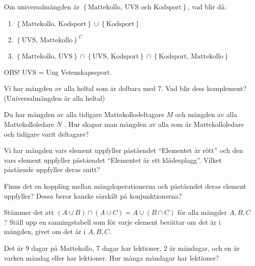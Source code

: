 \begin{problem}
	Om universalmängden är \(\left\{\text{Mattekollo, UVS och Kodsport} \right\}\), vad blir då:
	\begin{enumerate}[label=\alph*)]
		\item \(\left\{\text{Mattekollo, Kodsport} \right\} \cup \left\{\text{Kodsport} \right\}\) 
		\item \(\left\{\text{UVS, Mattekollo}\right\}^C\) 
		\item \(\left\{\text{Mattekollo, UVS}\right\} \cap \left\{\text{UVS, Kodsport} \right\} \cap \left\{\text{Kodsport, Mattekollo} \right\}\) 
	\end{enumerate}
	
	OBS! UVS = Ung Vetenskapssport.
\end{problem}

\begin{problem}
	Vi har mängden av alla heltal som är delbara med 7. Vad blir dess komplement? (Universalmängden är alla heltal)
\end{problem}

\begin{problem}
	Du har mängden av alla tidigare Mattekollodeltagare \(M\)  och mängden av alla Mattekolloledare \(N\) . Hur skapar man mängden av alla som är Mattekolloledare och tidigare varit deltagare?
\end{problem}

\begin{problem}
	Vi har mängden vars element uppfyller påståendet ``Elementet är rött'' och den vars element uppfyller påståendet ``Elementet är ett klädesplagg''. Vilket påstående uppfyller deras snitt?
\end{problem}

\begin{problem}
	Finns det en koppling mellan mängdoperationerna och påståendet deras element uppfyller? Dessa beror kanske särskilt på konjunktionerna?
\end{problem}

\begin{problem}
	Stämmer det att \((A \cup B) \cap (A \cup C) = A \cup (B \cap C)\) för alla mängder \(A, B, C\)? Ställ upp en sanningstabell som för varje element berättar om det är i mängden, givet om det är i \(A, B, C\).
\end{problem}

\begin{problem}[Extra]
	Det är 9 dagar på Mattekollo, 7 dagar har lektioner, 2 är måndagar, och en är varken måndag eller har lektioner. Hur många måndagar har lektioner?
\end{problem}

